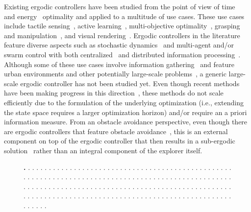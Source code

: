 \documentclass[letterpaper,10pt,conference,twoside]{IEEEtran}
\theoremstyle{definition}
\begin{document}
Existing ergodic controllers have been studied from the point of view of time~\cite{dong2023time} and energy~\cite{seewald2024energy,naveed2024eclares} optimality and applied to a multitude of use cases. These use cases include tactile sensing~\cite{abraham2017ergodic}, active learning~\cite{abraham2021ergodic}, multi-objective optimality~\cite{ren2023pareto,srinivasan2023multi}, grasping and manipulation~\cite{shetty2022ergodic,bilaloglu2023whole}, and visual rendering~\cite{low2022drozbot,prabhakar2020autonomous}. Ergodic controllers in the literature feature diverse aspects such as stochastic dynamics~\cite{torre2016ergodic,ayvali2017ergodic} and multi-agent and/or swarm control with both centralized~\cite{seewald2024energy,rao2024learning} and distributed information processing~\cite{prabhakar2020ergodic,coffin2022multi}. Although some of these use cases involve information gathering~\cite{dressel2018optimality} and feature urban environments and other potentially large-scale problems~\cite{prabhakar2020ergodic,rao2023multi}, a generic large-scale ergodic controller has not been studied yet. Even though recent methods have been making progress in this direction~\cite{whittemeyer2023bi,seewald2024energy,naveed2024eclares,dong2023time}, these methods do not scale efficiently due to the formulation of the underlying optimization (i.e., extending the state space requires a larger optimization horizon) and/or require an a priori information measure. From an obstacle avoidance perspective, even though there are ergodic controllers that feature obstacle avoidance~\cite{lerch2023safety}, this is an external component on top of the ergodic controller that then results in a sub-ergodic solution~\cite{dong2023time} rather than an integral component of the explorer itself.


\begin{figure}
  \centering
  
  \caption{\textbf{.}   .   .   .   .   .   .   .   .   .   .   .   .   .   .   .   .   .   .   .   .   .   .   .   .   .   .   .   .   .   .   .   .   .   .   .   .   .   .   .   .   .   .   .   .   .   .   .   .   .   .   .   .   .   .   .   .   .   .   .   .   .   .   .   .   .   .   .   .   .   .   .   .   .   .   .   .   .   .   .   .   .   .   .   .   .   .   .   .   .   .   .   .   .   .   .   .   .   .   .   .   .   .   .   .   .   .   .   .   .   .   .   .   .   .   .   .   .   .   .   .   .   .   .   .   .   .   .   .   .   .   .   .   .   .   .   .   .   .   .   .   .   .   .   .   .   .   .   .   .   .   .   .   .   .   .   .   .   .   .   .   .   .   .   .   .   .   .   .   .   .   .   .   .   .   .   .   .   .   .   .   .   .   .   .   .   .   .   .   .   .   .   .   .   .   .   .   .   .   .   .   .   .   .   .   .}
\end{figure}
\end{document}
